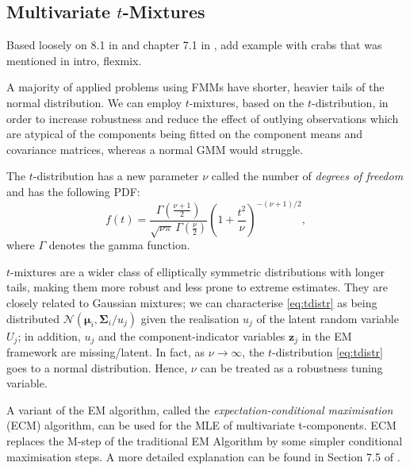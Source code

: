 \documentclass{article}\usepackage[]{graphicx}\usepackage[]{xcolor}
\theoremstyle{plain}
\theoremstyle{definition}
\theoremstyle{remark}
\newcommand{\boldz}{\mathbf{z}}
\newcommand{\boldmu}{\boldsymbol{\mu}}
\newcommand{\boldSigma}{\boldsymbol{\Sigma}}
\begin{document}
\subsection{Multivariate $t$-Mixtures}
Based loosely on 8.1 in \cite{annurev_FMMs} and chapter 7.1 in \cite{FMMs_Book}, add example with crabs that was mentioned in intro, flexmix.

A majority of applied problems using FMMs have shorter, heavier tails of the normal distribution. We can employ $t$-mixtures, based on the $t$-distribution, in order to increase robustness and reduce the effect of outlying observations which are atypical of the components being fitted on the component means and covariance matrices, whereas a normal GMM would struggle.

The $t$-distribution has a new parameter $\nu$ called the number of \textit{degrees of freedom} and has the following PDF: 
\begin{equation} \label{eq:tdistr}
  f(t) = \frac{\Gamma (\frac{\nu + 1}{2})}{\sqrt{\nu \pi} \, \Gamma (\frac{\nu}{2})}\left(1 + \frac{t^2}{\nu}\right)^{-(\nu + 1) / 2},
\end{equation}
where $\Gamma$ denotes the gamma function.

$t$-mixtures are a wider class of elliptically symmetric distributions with longer tails, making them more robust and less prone to extreme estimates. They are closely related to Gaussian mixtures; we can characterise \eqref{eq:tdistr} as being distributed $\mathcal{N}(\boldmu_i, \boldSigma_i / u_j)$ given the realisation $u_j$ of the latent random variable $U_j$; in addition, $u_j$ and the component-indicator variables $\boldz_j$ in the EM framework are missing/latent. In fact, as $\nu \to \infty$, the $t$-distribution \eqref{eq:tdistr} goes to a normal distribution. Hence, $\nu$ can be treated as a robustness tuning variable.

A variant of the EM algorithm, called the \textit{expectation-conditional maximisation} (ECM) algorithm, can be used for the MLE of multivariate t-components. ECM replaces the M-step of the traditional EM Algorithm by some simpler conditional maximisation steps. A more detailed explanation can be found in Section 7.5 of \cite{FMMs_Book}.

\newpage
\end{document}
